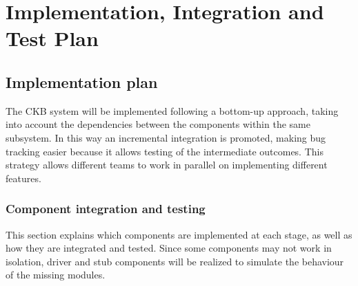 \chapter{Implementation, Integration and Test Plan}

\section{Implementation plan}
The CKB system will be implemented following a bottom-up approach, taking into account the dependencies between the components within the same subsystem. In this way an incremental integration is promoted, making bug tracking easier because it allows testing of the intermediate outcomes. This strategy allows different teams to work in parallel on implementing different features.

\subsection{Component integration and testing}
This section explains which components are implemented at each stage, as well as how they are integrated and tested. \newline
Since some components may not work in isolation, driver and stub components will be realized to simulate the behaviour of the missing modules. \newline

